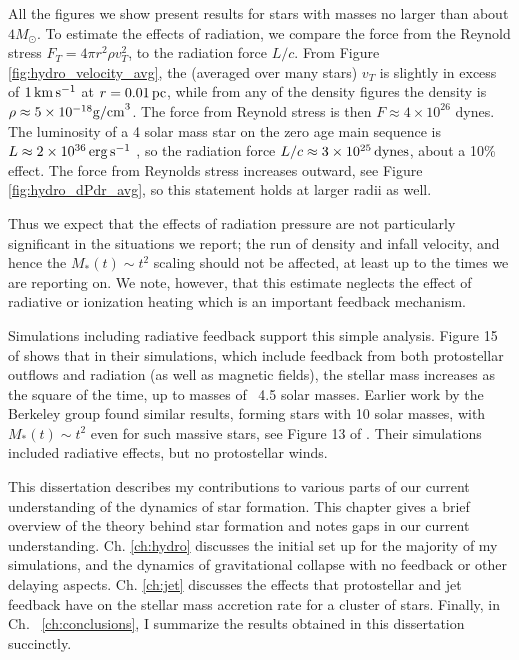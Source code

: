 \documentclass[../dissertation.tex]{subfiles}
\begin{document}
All the figures we show present results for stars with masses no larger than about $4 M_\odot$. To estimate the effects of radiation, we compare the force from the Reynold stress $F_T=4\pi r^2 \rho v_T^2$, to the radiation force $L/c$. 
From Figure \ref{fig:hydro_velocity_avg}, the (averaged over many stars) $v_T$ is slightly in excess of $1\,\rm km\,s^{-1}$ at $r=0.01\,\rm pc$, while from any of the density figures the density is $\rho\approx5\times10^{-18} {\rm g/cm}^3$. The force from Reynold stress is then $F\approx4\times 10^{26}$ dynes. The luminosity of a 4 solar mass star on the zero age main sequence is $L\approx 2\times10^{36}\,\rm erg\, s^{-1}$ \citep{1992A&AS...96..269S}, so the radiation force $L/c \approx 3\times10^{25}\,{\rm dynes}$, about a 10\% effect.  The force from Reynolds stress increases outward, see Figure \ref{fig:hydro_dPdr_avg}, so this statement holds at larger radii as well. 

Thus we expect that the effects of radiation pressure are not particularly significant in the situations we report;  the run of density and infall velocity, and hence the $M_*(t)\sim t^2$ scaling should not be affected, at least up to the times we are reporting on.  We note, however, that this estimate neglects the effect of radiative or ionization heating which is an important feedback mechanism.

Simulations including radiative feedback support this simple analysis. Figure 15 of  \citet{2014MNRAS.439.3420M} shows that in their simulations, which include feedback from both protostellar outflows and radiation (as well as magnetic fields), the stellar mass increases as the square of the time, up to masses of ~4.5 solar masses. Earlier work by the Berkeley group found similar results, forming stars with 10 solar masses, with $M_*(t)\sim t^2$ even for such massive stars, see Figure 13 of \citet{2012ApJ...754...71K}. Their simulations included radiative effects, but no protostellar winds. 




This dissertation describes my contributions to various parts of our current understanding of the dynamics of star formation. 
This chapter gives a brief overview of the theory behind star formation and notes gaps in our current understanding. 
Ch. \ref{ch:hydro} discusses the initial set up for the majority of my simulations, and the dynamics of gravitational collapse with no feedback or other delaying aspects.
Ch. \ref{ch:jet} discusses the effects that protostellar and jet feedback have on the stellar mass accretion rate for a cluster of stars.
Finally, in Ch. ~\ref{ch:conclusions}, I summarize the results obtained in this dissertation succinctly.
\end{document}
